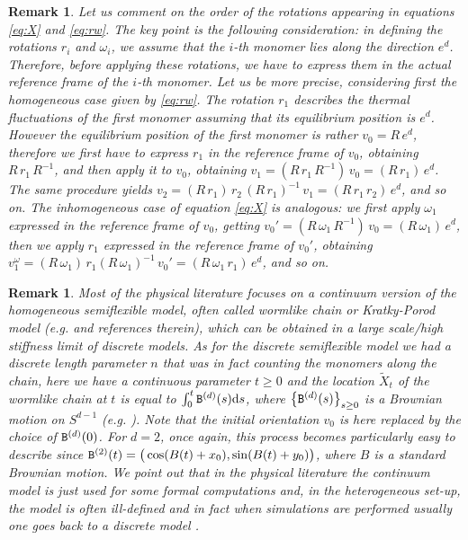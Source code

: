 \documentclass[a4paper,reqno,11pt]{amsart}
\numberwithin{equation}{section}
\newtheorem{rem}[theorem]{Remark}
\newcommand{\go}{\omega}
\renewcommand{\tilde}{\widetilde}          %
\newcommand{\dd}{\text{\rm d}}             %
\begin{document}

\medskip

\begin{rem}\label{rem:order} \rm
Let us comment on the order of the rotations appearing in equations \eqref{eq:X}
and \eqref{eq:rw}. The key point is the following consideration:
in defining the rotations $r_i$ and $\omega_i$, we assume that the
$i$-th monomer lies along the direction $e^d$. Therefore, before applying
these rotations, we have to express them in the actual reference frame of
the $i$-th monomer.
Let us be more precise, considering first
the homogeneous case given by \eqref{eq:rw}.
The rotation $r_1$ describes the thermal
fluctuations of the first monomer {\sl assuming that its equilibrium position is $e^d$}.
However the equilibrium position of the first monomer is rather $v_0 = R\, e^d$, therefore
we first have to express $r_1$ in the reference frame of $v_0$,
obtaining $R \, r_1 \, R^{-1}$, and then apply it to $v_0$, obtaining
$v_1 = (R \, r_1 \, R^{-1})\, v_0 = (R \, r_1) \, e^d$. The same procedure
yields $v_2 = (R \, r_1) \, r_2 \, (R \, r_1)^{-1} \, v_1 = (R \, r_1 \, r_2) \, e^d$,
and so on. The inhomogeneous case of equation \eqref{eq:X} is analogous:
we first apply $\go_1$ expressed in the reference frame of $v_0$, getting
$v_0' = (R \, \go_1 \, R^{-1}) \, v_0 = (R \, \go_1) \, e^d$, then we apply
$r_1$ expressed in the reference frame of $v_0'$, obtaining
$v_1^\go = (R \, \go_1) \, r_1 (R \, \go_1)^{-1} \, v_0' = (R \, \go_1 \, r_1) \, e^d$,
and so on.
\end{rem}


\smallskip


\begin{rem}\label{rem:continuum}
\rm
Most of the physical literature focuses
on
a continuum version of the homogeneous
semiflexible model, often called {\sl wormlike chain}  or {\sl Kratky-Porod} model
({\sl e.g.} \cite{cf:WN} and references therein),
which can be  obtained in a large scale/high stiffness limit
of discrete models.
As for the discrete semiflexible model we had a discrete length parameter
$n$ that was in fact counting the monomers along the chain, here we have
a continuous parameter $t\ge 0$ and the location $\tilde X_t$ of
the wormlike chain at $t$ is equal to
$\int_{0}^t {\tt B}^{(d)}(s) \dd s$,
where $\left\{ {\tt B}^{(d)}(s)\right\}_{s\ge 0}$
is a Brownian motion on $S^{d-1}$ ({\sl e.g.} \cite{cf:RW}). Note that
the initial orientation $v_0$ is here replaced by the choice of ${\tt B}^{(d)}(0)$.
For $d=2$, once again, this process becomes particularly
easy to describe since ${\tt B}^{(2)}(t)=
\big( \cos (B(t)+x_0), \sin(B(t)+y_0) \big)$,
where $B$ is a standard Brownian motion.
We point out that in the physical literature the continuum model is just used
for some {\sl formal} computations and, in the heterogeneous set-up, the model
is often ill-defined and in fact when simulations are performed usually one
goes back to a discrete model \cite{cf:BDM,cf:MN,cf:Vaillant,cf:WN,cf:ZC}.
\end{rem}
\end{document}
